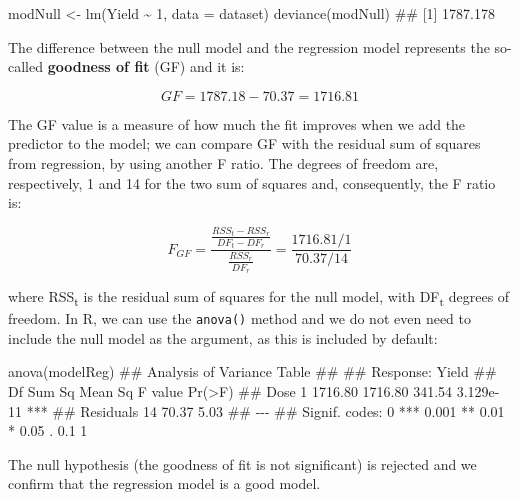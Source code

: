 \documentclass[a4paper,12pt,oneside]{book}
\newenvironment{Shaded}{\begin{snugshade}}{\end{snugshade}}
\newcommand{\DecValTok}[1]{#1}
\newcommand{\SpecialCharTok}[1]{#1}
\newcommand{\DocumentationTok}[1]{#1}
\newcommand{\OtherTok}[1]{#1}
\newcommand{\FunctionTok}[1]{#1}
\newcommand{\AttributeTok}[1]{#1}
\newcommand{\NormalTok}[1]{#1}
\begin{document}
\begin{Shaded}
\begin{Highlighting}[]
\NormalTok{modNull }\OtherTok{\textless{}{-}} \FunctionTok{lm}\NormalTok{(Yield }\SpecialCharTok{\textasciitilde{}} \DecValTok{1}\NormalTok{, }\AttributeTok{data =}\NormalTok{ dataset)}
\FunctionTok{deviance}\NormalTok{(modNull)}
\DocumentationTok{\#\# [1] 1787.178}
\end{Highlighting}
\end{Shaded}

The difference between the null model and the regression model represents the so-called \textbf{goodness of fit} (GF) and it is:

\[GF = 1787.18 - 70.37 = 1716.81\]

The GF value is a measure of how much the fit improves when we add the predictor to the model; we can compare GF with the residual sum of squares from regression, by using another F ratio. The degrees of freedom are, respectively, 1 and 14 for the two sum of squares and, consequently, the F ratio is:

\[ F_{GF} = \frac{\frac{RSS_t - RSS_r}{DF_t - DF_r} } {\frac{RSS_r}{DF_r}} = \frac{1716.81/1}{70.37/14}\]

where RSS\textsubscript{t} is the residual sum of squares for the null model, with DF\textsubscript{t} degrees of freedom. In R, we can use the \texttt{anova()} method and we do not even need to include the null model as the argument, as this is included by default:

\begin{Shaded}
\begin{Highlighting}[]
\FunctionTok{anova}\NormalTok{(modelReg)}
\DocumentationTok{\#\# Analysis of Variance Table}
\DocumentationTok{\#\# }
\DocumentationTok{\#\# Response: Yield}
\DocumentationTok{\#\#           Df  Sum Sq Mean Sq F value    Pr(\textgreater{}F)    }
\DocumentationTok{\#\# Dose       1 1716.80 1716.80  341.54 3.129e{-}11 ***}
\DocumentationTok{\#\# Residuals 14   70.37    5.03                      }
\DocumentationTok{\#\# {-}{-}{-}}
\DocumentationTok{\#\# Signif. codes:  0 \textquotesingle{}***\textquotesingle{} 0.001 \textquotesingle{}**\textquotesingle{} 0.01 \textquotesingle{}*\textquotesingle{} 0.05 \textquotesingle{}.\textquotesingle{} 0.1 \textquotesingle{} \textquotesingle{} 1}
\end{Highlighting}
\end{Shaded}

The null hypothesis (the goodness of fit is not significant) is rejected and we confirm that the regression model is a good model.
\end{document}
